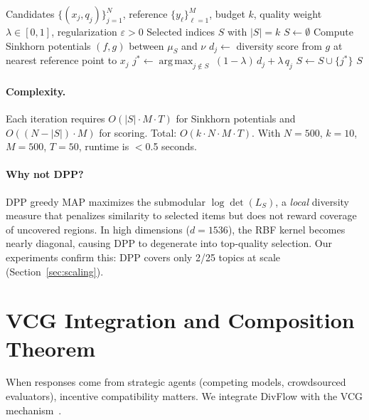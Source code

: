 \documentclass[10pt]{article}
\DeclareMathOperator*{\argmax}{arg\,max}
\begin{document}
\begin{algorithm}[t]
\caption{DivFlow: Sinkhorn-Guided Diverse Selection}
\label{alg:divflow}
\begin{algorithmic}[1]
\REQUIRE Candidates $\{(x_j, q_j)\}_{j=1}^N$, reference $\{y_\ell\}_{\ell=1}^M$, budget $k$, quality weight $\lambda \in [0,1]$, regularization $\varepsilon > 0$
\ENSURE Selected indices $S$ with $|S| = k$
\STATE $S \leftarrow \emptyset$
  \STATE Compute Sinkhorn potentials $(f, g)$ between $\mu_S$ and $\nu$
    \STATE $d_j \leftarrow$ diversity score from $g$ at nearest reference point to $x_j$
  \ENDFOR
  \STATE $j^* \leftarrow \argmax_{j \notin S}\; (1-\lambda)\, d_j + \lambda\, q_j$
  \STATE $S \leftarrow S \cup \{j^*\}$
\ENDFOR
\RETURN $S$
\end{algorithmic}
\end{algorithm}

\paragraph{Complexity.}
Each iteration requires $O(|S| \cdot M \cdot T)$ for Sinkhorn potentials and $O((N - |S|) \cdot M)$ for scoring.
Total: $O(k \cdot N \cdot M \cdot T)$.
With $N=500$, $k=10$, $M=500$, $T=50$, runtime is $<$0.5 seconds.

\paragraph{Why not DPP?}
DPP greedy MAP maximizes the submodular $\log\det(L_S)$, a \emph{local} diversity measure that penalizes similarity to selected items but does not reward coverage of uncovered regions.
In high dimensions ($d=1536$), the RBF kernel becomes nearly diagonal, causing DPP to degenerate into top-quality selection.
Our experiments confirm this: DPP covers only 2/25 topics at scale (Section~\ref{sec:scaling}).

\section{VCG Integration and Composition Theorem}
\label{sec:vcg}

When responses come from strategic agents (competing models, crowdsourced evaluators), incentive compatibility matters.
We integrate DivFlow with the VCG mechanism~\citep{vickrey1961counterspeculation, clarke1971multipart, groves1973incentives}.
\end{document}
